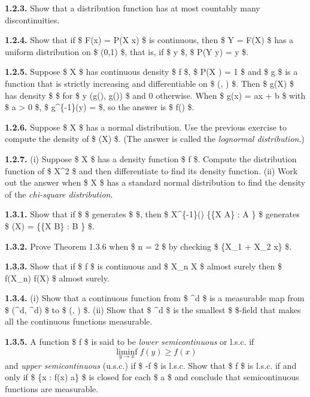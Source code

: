 \documentclass[
  letterpaper,
  DIV=11,
  numbers=noendperiod]{scrartcl}
\begin{document}
\textbf{1.2.3.} Show that a distribution function has at most countably
many discontinuities.

\textbf{1.2.4.} Show that if \$ F(x) = P(X \leq x) \$ is continuous,
then \$ Y = F(X) \$ has a uniform distribution on \$ (0,1) \$, that is,
if \$ y \in [0,1] \$, \$ P(Y \leq y) = y \$.

\textbf{1.2.5.} Suppose \$ X \$ has continuous density \$ f \$, \$
P(\alpha \leq X \leq \beta) = 1 \$ and \$ g \$ is a function that is
strictly increasing and differentiable on \$ (\alpha, \beta) \$. Then \$
g(X) \$ has density \$  \$ for \$ y
\in (g(\alpha), g(\beta)) \$ and 0 otherwise. When \$ g(x) = ax + b \$
with \$ a \textgreater{} 0 \$, \$ g\^{}\{-1\}(y) =  \$,
so the answer is \$ f\left(\right) \$.

\textbf{1.2.6.} Suppose \$ X \$ has a normal distribution. Use the
previous exercise to compute the density of \$ \exp(X) \$. (The answer
is called the \emph{lognormal distribution}.)

\textbf{1.2.7.} (i) Suppose \$ X \$ has a density function \$ f \$.
Compute the distribution function of \$ X\^{}2 \$ and then differentiate
to find its density function. (ii) Work out the answer when \$ X \$ has
a standard normal distribution to find the density of the
\emph{chi-square distribution}.

\textbf{1.3.1.} Show that if \$  \$ generates \$ 
\$, then \$ X\^{}\{-1\}() \equiv \left\{\{X \in A\} : A
\in {}\right\} \$ generates \$ \sigma(X) = \left\{\{X \in B\} :
B \in {}\right\} \$.

\textbf{1.3.2.} Prove Theorem 1.3.6 when \$ n = 2 \$ by checking \$
\{X\_1 + X\_2 \leq x\} \in {} \$.

\textbf{1.3.3.} Show that if \$ f \$ is continuous and \$ X\_n \to X \$
almost surely then \$ f(X\_n) \to f(X) \$ almost surely.

\textbf{1.3.4.} (i) Show that a continuous function from \$
\^{}d \to {} \$ is a measurable map from \$
(\^{}d, \^{}d) \$ to \$ (, )
\$. (ii) Show that \$ \^{}d \$ is the smallest \$
\sigma \$-field that makes all the continuous functions measurable.

\textbf{1.3.5.} A function \$ f \$ is said to be \emph{lower
semicontinuous} or l.s.c. if \[
\liminf_{y \to x} f(y) \geq f(x)
\] and \emph{upper semicontinuous} (u.s.c.) if \$ -f \$ is l.s.c. Show
that \$ f \$ is l.s.c. if and only if \$ \{x : f(x) \leq a\} \$ is
closed for each \$ a \in {} \$ and conclude that semicontinuous
functions are measurable.
\end{document}

